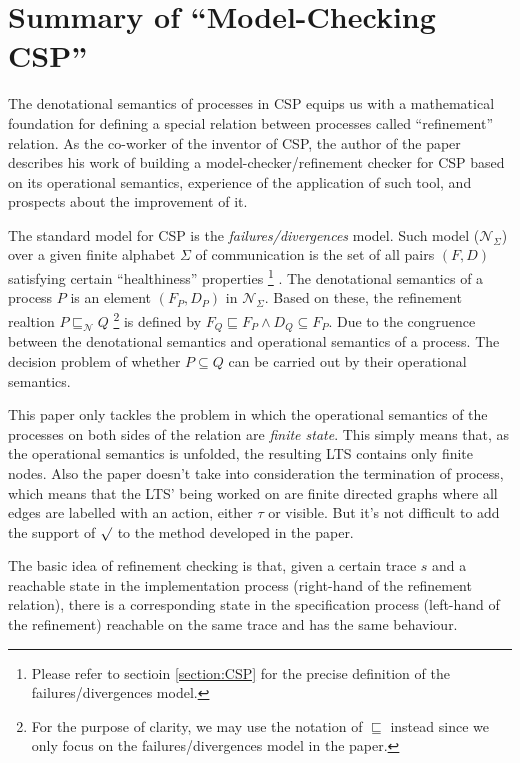 \documentclass{llncs}
\newcommand{\csptick}{\surd}
\newcommand{\cspfdrmodel}{\mathcal{N}}
\begin{document}
\newpage
\section{Summary of ``Model-Checking CSP''\cite{Roscoe1994Modelchecking}}
  \label{section:modelcheckingcsp}
The denotational semantics of processes in CSP equips us with a mathematical
foundation for defining a special relation between processes called
``refinement'' relation. As the co-worker of the inventor of CSP, the author of
the paper describes his work of building a model-checker/refinement checker for
CSP based on its operational semantics, experience of the application of such tool,
 and prospects about the improvement of it.

The standard model for CSP is the \emph{failures/divergences} model. Such model
($\cspfdrmodel_{\Sigma}$) over a given finite alphabet $\Sigma$ of communication
is the set of all pairs $(F, D)$ satisfying certain ``healthiness'' properties
\footnote{Please refer to sectioin \ref{section:CSP} for the precise definition of the
failures/divergences model.}
. The denotational semantics of a process $P$ is an element $(F_P, D_P)$ in 
$\cspfdrmodel_{\Sigma}$. 
Based on these, the refinement realtion $P \sqsubseteq_{\cspfdrmodel} Q$
\footnote{For the purpose of clarity, we may use the notation of $\sqsubseteq$
instead since we only focus on the failures/divergences model in the paper.}
is defined by $F_Q \sqsubseteq F_P \land D_Q \subseteq F_P$.
Due to the congruence between the denotational semantics and operational
semantics of a process. The decision problem of whether $P \subseteq Q$ can
be carried out by their operational semantics.

This paper only tackles the problem in which the operational semantics of the
processes on both sides of the relation are \emph{finite state}. This simply
means that, as the operational semantics is unfolded, the resulting LTS contains
only finite nodes. Also the paper doesn't take into consideration the
termination of process, which means that the LTS' being worked on are finite
directed graphs where all edges are labelled with an action, either $\tau$ or
visible. But it's not difficult to add the support of $\csptick$ to the method
developed in the paper.

The basic idea of refinement checking is that, given a certain trace $s$ and a
reachable state in the implementation process (right-hand of the refinement
relation), there is a corresponding state in the specification process
(left-hand of the refinement) reachable on the same trace and has the same
behaviour.
\end{document}
